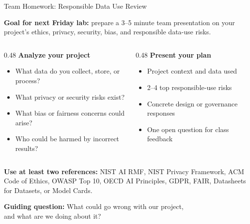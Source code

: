 \documentclass[aspectratio=43,12pt]{beamer}
\begin{document}
\begin{frame}{Team Homework: Responsible Data Use Review}
\footnotesize

\textbf{Goal for next Friday lab:} prepare a 3--5 minute team presentation on your project's ethics, privacy, security, bias, and responsible data-use risks.

\vspace{0.75em}
\begin{columns}[T,totalwidth=\textwidth]
\begin{column}{0.48\textwidth}
\textbf{Analyze your project}
\begin{itemize}
  \item What data do you collect, store, or process?
  \item What privacy or security risks exist?
  \item What bias or fairness concerns could arise?
  \item Who could be harmed by incorrect results?
\end{itemize}
\end{column}
\begin{column}{0.48\textwidth}
\textbf{Present your plan}
\begin{itemize}
  \item Project context and data used
  \item 2--4 top responsible-use risks
  \item Concrete design or governance responses
  \item One open question for class feedback
\end{itemize}
\end{column}
\end{columns}

\vspace{0.75em}
\textbf{Use at least two references:} NIST AI RMF, NIST Privacy Framework, ACM Code of Ethics, OWASP Top 10, OECD AI Principles, GDPR, FAIR, Datasheets for Datasets, or Model Cards.

\vspace{0.5em}
\centering
\textbf{Guiding question:} What could go wrong with our project,\\and what are we doing about it?
\end{frame}
\end{document}
